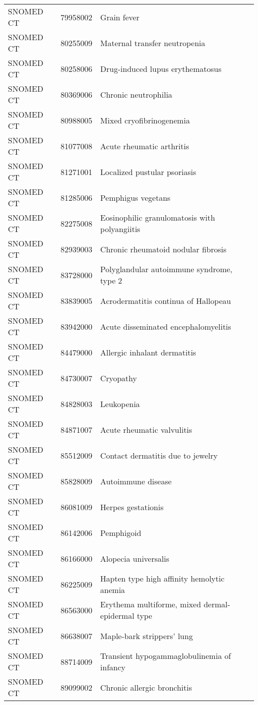 \begin{longtable}{p{}p{}p{}}
  SNOMED CT & 79958002 & Grain fever \\ 
  SNOMED CT & 80255009 & Maternal transfer neutropenia \\ 
  SNOMED CT & 80258006 & Drug-induced lupus erythematosus \\ 
  SNOMED CT & 80369006 & Chronic neutrophilia \\ 
  SNOMED CT & 80988005 & Mixed cryofibrinogenemia \\ 
  SNOMED CT & 81077008 & Acute rheumatic arthritis \\ 
  SNOMED CT & 81271001 & Localized pustular psoriasis \\ 
  SNOMED CT & 81285006 & Pemphigus vegetans \\ 
  SNOMED CT & 82275008 & Eosinophilic granulomatosis with polyangiitis \\ 
  SNOMED CT & 82939003 & Chronic rheumatoid nodular fibrosis \\ 
  SNOMED CT & 83728000 & Polyglandular autoimmune syndrome, type 2 \\ 
  SNOMED CT & 83839005 & Acrodermatitis continua of Hallopeau \\ 
  SNOMED CT & 83942000 & Acute disseminated encephalomyelitis \\ 
  SNOMED CT & 84479000 & Allergic inhalant dermatitis \\ 
  SNOMED CT & 84730007 & Cryopathy \\ 
  SNOMED CT & 84828003 & Leukopenia \\ 
  SNOMED CT & 84871007 & Acute rheumatic valvulitis \\ 
  SNOMED CT & 85512009 & Contact dermatitis due to jewelry \\ 
  SNOMED CT & 85828009 & Autoimmune disease \\ 
  SNOMED CT & 86081009 & Herpes gestationis \\ 
  SNOMED CT & 86142006 & Pemphigoid \\ 
  SNOMED CT & 86166000 & Alopecia universalis \\ 
  SNOMED CT & 86225009 & Hapten type high affinity hemolytic anemia \\ 
  SNOMED CT & 86563000 & Erythema multiforme, mixed dermal-epidermal type \\ 
  SNOMED CT & 86638007 & Maple-bark strippers' lung \\ 
  SNOMED CT & 88714009 & Transient hypogammaglobulinemia of infancy \\ 
  SNOMED CT & 89099002 & Chronic allergic bronchitis \\ 

\end{longtable}
